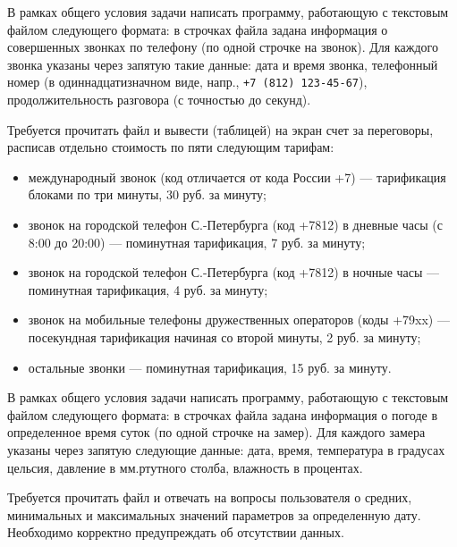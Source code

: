 
\begin{zztask}
В рамках общего условия задачи написать программу, работающую с текстовым файлом
следующего формата: в строчках файла задана информация
о совершенных звонках по телефону (по одной строчке на звонок).
Для каждого звонка указаны через запятую такие данные: дата и время звонка, телефонный
номер (в одиннадцатизначном виде, напр., \verb|+7 (812) 123-45-67|), продолжительность 
разговора (с точностью до секунд). 

Требуется прочитать файл и вывести (таблицей) на экран счет за переговоры, расписав
отдельно стоимость по пяти следующим тарифам:
%
\begin{itemize}
\item международный звонок (код отличается от кода России +7) --- тарификация
      блоками по три минуты, 30 руб. за минуту;
\item звонок на городской телефон С.-Петербурга (код +7812) в дневные часы (с
      8:00 до 20:00) --- поминутная тарификация, 7 руб. за минуту;
\item звонок на городской телефон С.-Петербурга (код +7812) в ночные часы ---
      поминутная тарификация, 4 руб. за минуту;
\item звонок на мобильные телефоны дружественных операторов (коды +79xx) ---
      посекундная тарификация начиная со второй минуты, 2 руб. за минуту;
\item остальные звонки --- поминутная тарификация, 15 руб. за минуту.
\end{itemize}
\end{zztask}


\begin{zztask}
В рамках общего условия задачи написать программу, работающую с текстовым файлом
следующего формата: в строчках файла задана информация 
о погоде в определенное время суток (по одной 
строчке на замер). Для каждого замера указаны через запятую следующие данные:
дата, время, температура в градусах цельсия, давление в мм.ртутного столба, влажность
в процентах.

Требуется прочитать файл и отвечать на вопросы пользователя о средних, минимальных и 
максимальных значений параметров за определенную дату. Необходимо корректно предупреждать
об отсутствии данных.
\end{zztask}

